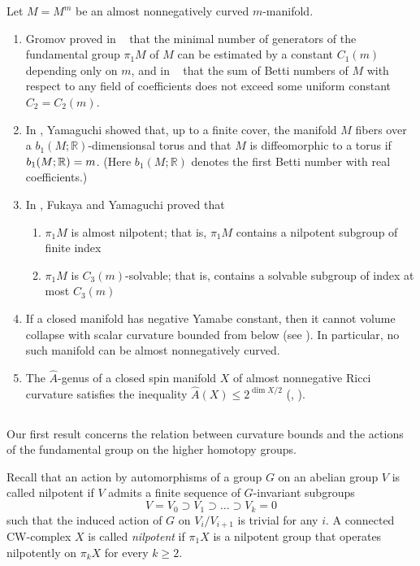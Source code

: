 \documentclass{amsart}
\begin{document}
Let $M=M^m$ be an almost nonnegatively curved $m$-manifold.
\begin{enumerate}[$\diamond$]
\item Gromov proved in ~\cite{G1}
that the minimal number of generators of the fundamental
group $\pi_1M$ of $M$ can be estimated by a constant $C_1(m)$
depending only on $m$,
and in ~\cite{G2} that the sum of Betti numbers of $M$ with
respect to any field of coefficients
does not exceed some uniform constant $C_2=C_2(m)$.
\item In \cite{Yam},
Yamaguchi showed that, up to a finite cover, the manifold $M$
fibers over a $b_1(M;\mathbb{R})$-dimensionsal torus
and that $M$ is diffeomorphic to a torus if $b_1(M;\mathbb{R})\z=m$. (Here $b_1(M;\mathbb{R})$ denotes the first Betti number with real coefficients.)
\item In \cite{FY},
Fukaya and Yamaguchi proved that 
\begin{enumerate}[$\circ$]
\item $\pi_1M$ is almost nilpotent;
that is, $\pi_1M$ contains a nilpotent subgroup of finite index
\item $\pi_1M$ is $C_3(m)$-solvable;
that is, contains a solvable subgroup of index at most $C_3(m)$
\end{enumerate}
\item If a closed manifold has  negative Yamabe constant,
then it cannot volume collapse with scalar curvature bounded from below
(see \cite{Sch,Lb}).  In particular, no such manifold
can be almost nonnegatively curved.
\item The $\hat{A}$-genus of a closed spin manifold $X$
of almost nonnegative Ricci curvature satisfies the inequality
$\hat{A}(X)\le 2^{\dim X/2}$ (\cite{G5}, \cite{Ga}).
\end{enumerate}

\subsection{}
Our first result concerns the relation between curvature bounds and the actions of the fundamental group on the higher homotopy groups.



Recall that an action by automorphisms of a group $G$ on an abelian group $V$
is called nilpotent if $V$
admits a finite sequence of $G$-invariant subgroups
 $$V=V_0\supset V_1\supset\ldots\supset V_k=0$$
such that the induced action of $G$ on $V_i/V_{i+1}$ is trivial for any $i$.
A connected CW-complex $X$ is called \emph{nilpotent}
if $\pi_1X$ is a nilpotent group that operates nilpotently
on $\pi_kX$ for every $k\ge 2$.
\end{document}
